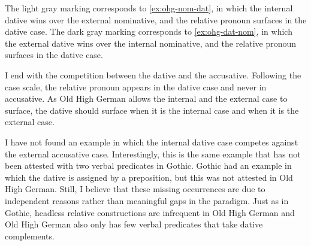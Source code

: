The light gray marking corresponds to \ref{ex:ohg-nom-dat}, in which the internal dative wins over the external nominative, and the relative pronoun surfaces in the dative case. The dark gray marking corresponds to \ref{ex:ohg-dat-nom}, in which the external dative wins over the internal nominative, and the relative pronoun surfaces in the dative case.

I end with the competition between the dative and the accusative. Following the case scale, the relative pronoun appears in the dative case and never in accusative. As Old High German allows the internal and the external case to surface, the dative should surface when it is the internal case and when it is the external case.

I have not found an example in which the internal dative case competes against the external accusative case.
Interestingly, this is the same example that has not been attested with two verbal predicates in Gothic. Gothic had an example in which the dative is assigned by a preposition, but this was not attested in Old High German.
Still, I believe that these missing occurrences are due to independent reasons rather than meaningful gaps in the paradigm.
Just as in Gothic, headless relative constructions are infrequent in Old High German and Old High German also only has few verbal predicates that take dative complements.


%

